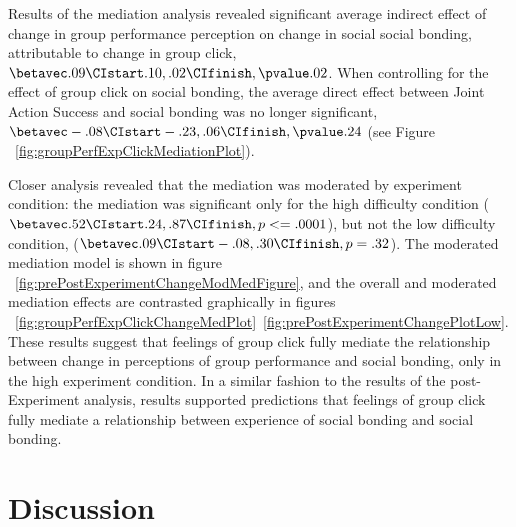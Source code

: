 Results of the mediation analysis revealed significant average indirect effect of change in group performance perception on change in social social bonding, attributable to change in group click, $\betavec.09 \CIstart .10, .02 \CIfinish, \pvalue .02$.  When controlling for the effect of group click on social bonding, the average direct effect between Joint Action Success and social bonding was no longer significant, $\betavec -.08 \CIstart -.23, .06 \CIfinish, \pvalue .24$  (see Figure ~\ref{fig:groupPerfExpClickMediationPlot}).



Closer analysis revealed that the mediation was moderated by experiment condition: the mediation was significant only for the high difficulty condition ($\betavec .52 \CIstart .24, .87 \CIfinish, p <=.0001$), but not the low difficulty condition, ($\betavec .09 \CIstart -.08, .30 \CIfinish, p =.32$). The moderated mediation model is shown in figure ~\ref{fig:prePostExperimentChangeModMedFigure}, and the overall and moderated mediation effects are contrasted graphically in figures ~\ref{fig:groupPerfExpClickChangeMedPlot}\nobreakdash~\ref{fig:prePostExperimentChangePlotLow}.  These results suggest that feelings of group click fully mediate the relationship between change in perceptions of group performance and social bonding, only in the high experiment condition.  In a similar fashion to the results of the post-Experiment analysis, results supported predictions that feelings of group click fully mediate a relationship between experience of social bonding and social bonding.




\section{Discussion}
